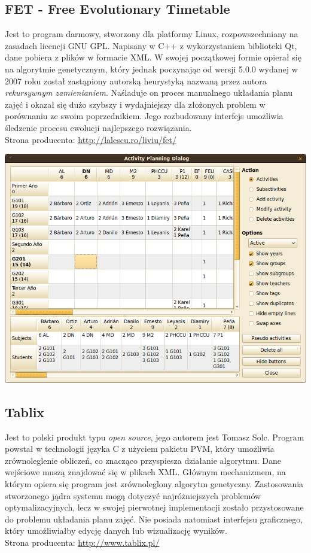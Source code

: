 \subsection{FET - Free Evolutionary Timetable}
Jest to program darmowy, stworzony dla platformy Linux, rozpowszechniany na zasadach licencji GNU GPL. Napisany w C++ z wykorzystaniem biblioteki Qt, dane pobiera z plików w formacie XML. W swojej początkowej formie opierał się na algorytmie genetycznym, który jednak poczynając od wersji 5.0.0 wydanej w 2007 roku został zastąpiony autorską heurystyką nazwaną przez autora \emph{rekursywnym zamienianiem}. Naśladuje on proces manualnego układania planu zajęć i okazał się dużo szybszy i wydajniejszy dla złożonych problem w porównaniu ze swoim poprzednikiem. Jego rozbudowany interfejs umożliwia śledzenie procesu ewolucji najlepszego rozwiązania. \\
Strona producenta: \url{http://lalescu.ro/liviu/fet/}
\begin{center}
\includegraphics[width=15cm]{img/FET.png}
\end{center}
\subsection{Tablix}
Jest to polski produkt typu \emph{open source}, jego autorem jest Tomasz Solc\cite{implementacjeGA}. Program powstał w technologii języka C z użyciem pakietu PVM, który umożliwia zrównoleglenie obliczeń, co znacząco przyspiesza działanie algorytmu. Dane wejściowe muszą znajdować się w plikach XML. Głównym mechanizmem, na którym opiera się program jest zrównoleglony algorytm genetyczny. Zastosowania stworzonego jądra systemu mogą dotyczyć najróżniejszych problemów optymalizacyjnych, lecz w swojej pierwotnej implementacji zostało przystosowane do problemu układania planu zajęć. Nie posiada natomiast interfejsu graficznego, który umożliwiałby edycję danych lub wizualizację wyników.\\
Strona producenta: \url{http://www.tablix.pl/}
